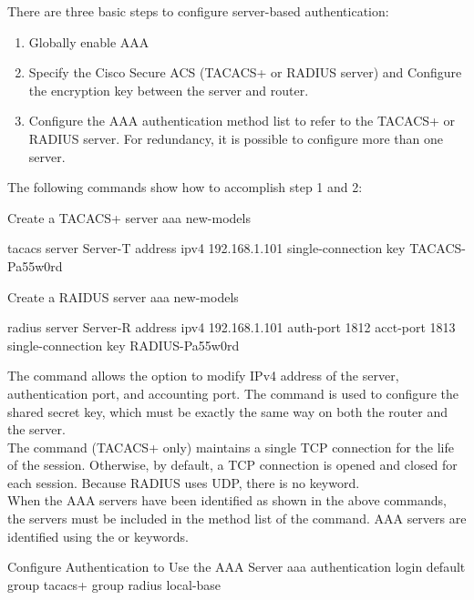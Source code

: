 There are three basic steps to configure server-based authentication:

\begin{enumerate}
\item Globally enable AAA
\item Specify the Cisco Secure ACS (TACACS+ or RADIUS server) and Configure the encryption key between the server and router.
\item Configure the AAA authentication method list to refer to the TACACS+ or RADIUS server. For redundancy, it is possible to configure more than one server.
\end{enumerate}

The following commands show how to accomplish step 1 and 2:

\begin{sexylisting}{Create a TACACS+ server}
aaa new-models

tacacs server Server-T
  address ipv4 192.168.1.101
  single-connection
  key TACACS-Pa55w0rd
\end{sexylisting}

\begin{sexylisting}{Create a RAIDUS server}
aaa new-models
 
radius server Server-R
  address ipv4 192.168.1.101 auth-port 1812 acct-port 1813
  single-connection
  key RADIUS-Pa55w0rd
\end{sexylisting}

The  command allows the option to modify IPv4 address of the server, authentication port, and accounting port. The  command is used to configure the shared secret key, which must be exactly the same way on both the router and the server.\\

The  command (TACACS+ only) maintains a single TCP connection for the life of the session. Otherwise, by default, a TCP connection is opened and closed for each session. Because RADIUS uses UDP, there is no  keyword.\\

When the AAA servers have been identified as shown in the above commands, the servers must be included in the method list of the  command. AAA servers are identified using the  or  keywords. 

\begin{sexylisting}{Configure Authentication to Use the AAA Server}
aaa authentication login default group tacacs+ group radius local-base
\end{sexylisting}

